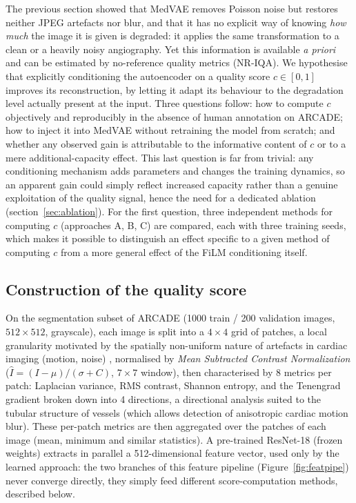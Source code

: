 \documentclass[conference]{IEEEtran}
\begin{document}
The previous section showed that MedVAE removes Poisson noise but
restores neither JPEG artefacts nor blur, and that it has no explicit way
of knowing \emph{how much} the image it is given is degraded: it applies
the same transformation to a clean or a heavily noisy angiography. Yet this
information is available \emph{a priori} and can be estimated by
no-reference quality metrics (NR-IQA). We hypothesise that explicitly
conditioning the autoencoder on a quality score $c \in [0,1]$ improves its
reconstruction, by letting it adapt its behaviour to the degradation level
actually present at the input. Three questions follow: how to compute $c$
objectively and reproducibly in the absence of human annotation on
ARCADE; how to inject it into MedVAE without retraining the model from
scratch; and whether any observed gain is attributable to the informative
content of $c$ or to a mere additional-capacity effect. This last
question is far from trivial: any conditioning mechanism adds parameters
and changes the training dynamics, so an apparent gain could simply
reflect increased capacity rather than a genuine exploitation of the
quality signal, hence the need for a dedicated ablation
(section~\ref{sec:ablation}). For the first question, three independent
methods for computing $c$ (approaches A, B, C) are compared, each with
three training seeds, which makes it possible to distinguish an
effect specific to a given method of computing $c$ from a more general
effect of the FiLM conditioning itself.

\subsection{Construction of the quality score}
\label{sec:score}

On the segmentation subset of ARCADE (1000 train / 200 validation images,
$512\times512$, grayscale), each image is split into a $4\times4$ grid of
patches, a local granularity motivated by the spatially non-uniform
nature of artefacts in cardiac imaging (motion, noise)
\cite{sekiguchi2025patchdsa}, normalised by \emph{Mean Subtracted Contrast
Normalization} ($\hat{I}=(I-\mu)/(\sigma+C)$, $7\times7$ window), then
characterised by 8 metrics per patch: Laplacian variance, RMS contrast,
Shannon entropy, and the Tenengrad gradient broken down into 4
directions, a directional analysis suited to the tubular structure of
vessels \cite{wang2024noreference} (which allows detection of anisotropic
cardiac motion blur). These per-patch metrics are then aggregated over
the patches of each image (mean, minimum and similar statistics). A pre-trained ResNet-18 (frozen weights) extracts in parallel a
512-dimensional feature vector, used only by the learned approach: the
two branches of this feature pipeline (Figure~\ref{fig:featpipe}) never
converge directly, they simply feed different score-computation methods,
described below.
\end{document}
